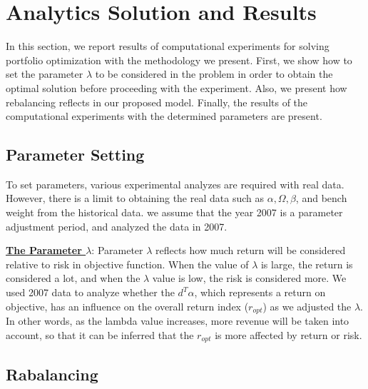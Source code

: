 \documentclass[11pt]{article}
\begin{document}
	
	
	
	\section*{Analytics Solution and Results}
	\setcounter{subsection}{0}
	
	In this section, we report results of computational experiments for solving portfolio optimization with the methodology we present. First, we show how to set the parameter $\lambda$ to be considered in the problem in order to obtain the optimal solution before proceeding with the experiment. Also, we present how rebalancing reflects in our proposed model. Finally, the results of the computational experiments with the determined parameters are present.
	
	\subsection{Parameter Setting}
	
	To set parameters, various experimental analyzes are required with real data. However, there is a limit to obtaining the real data such as $\alpha, \Omega, \beta$, and bench weight from the historical data. we assume that the year 2007 is a parameter adjustment period, and analyzed the data in 2007. 
	
	\underline{\textbf{The Parameter $\lambda$}}: Parameter $ \lambda $ reflects how much return will be considered relative to risk in objective function. When the value of $ \lambda $ is large, the return is considered a lot, and when the $ \lambda $ value is low, the risk is considered more. We used 2007 data to analyze whether the $d^{T} \alpha$, which represents a return on objective, has an influence on the overall return index ($r_{opt}$) as we adjusted the $\lambda$. In other words, as the lambda value increases, more revenue will be taken into account, so that it can be inferred that the $r_{opt}$  is more affected by return or risk.
	
	\subsection{Rabalancing}
	
\end{document}
